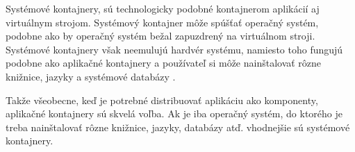Systémové kontajnery, sú technologicky podobné kontajnerom aplikácií aj virtuálnym strojom. Systémový kontajner môže spúšťať operačný systém, podobne ako by operačný systém bežal zapuzdrený na virtuálnom stroji. Systémové kontajnery však neemulujú hardvér systému, namiesto toho fungujú podobne ako aplikačné kontajnery a používateľ si môže nainštalovať rôzne knižnice, jazyky a systémové databázy \cite{systemvsapli}.

Takže všeobecne, keď je potrebné distribuovať aplikáciu ako komponenty, aplikačné kontajnery sú skvelá voľba. Ak je iba operačný systém, do ktorého je treba nainštalovať rôzne knižnice, jazyky, databázy atď. vhodnejšie sú systémové kontajnery.
